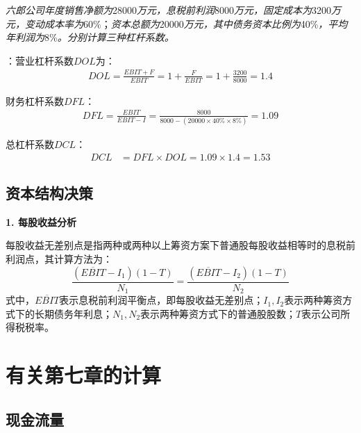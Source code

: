 \documentclass[
  10pt,
  twoside,
  openany,
  b5paper, %
  colorscheme = black, %
  xits = false,
]{qyxf-book}
\begin{document}
\emph{六郎公司年度销售净额为}28000\emph{万元，息税前利润}8000\emph{万元，固定成本为}3200\emph{万元，变动成本率为}60\%；\emph{资本总额为}20000\emph{万元，其中债务资本比例为}40\%\emph{，平均年利润为}8\%\emph{。分别计算三种杠杆系数。}

\solve[答]：营业杠杆系数$DOL$为：
\begin{equation*}
	\begin{aligned}
		DOL = \frac{EBIT+F}{EBIT} 
		= 1+\frac{F}{EBIT} 
		= 1+\frac{3200}{8000} 
		= 1.4
	\end{aligned}
\end{equation*}

财务杠杆系数$DFL$：
\begin{equation*}
	\begin{aligned}
		DFL = \frac{EBIT}{EBIT-I} 
		= \frac{8000}{8000-(20000\times 40\% \times 8\%)} 
		= 1.09
	\end{aligned}
\end{equation*}

总杠杆系数$DCL$：
\begin{equation*}
	\begin{aligned}
		DCL &= DFL \times DOL = 1.09 \times 1.4 
		= 1.53
	\end{aligned}
\end{equation*}
\subsection{资本结构决策}

\textbf{1. 每股收益分析}

每股收益无差别点是指两种或两种以上筹资方案下普通股每股收益相等时的息税前利润点，其计算方法为：
\begin{equation*}
	\frac{(\overline{EBIT}-I_1)(1-T)}{N_1}= \frac{(\overline{EBIT}-I_2)(1-T)}{N_2}
\end{equation*}
式中，$\overline{EBIT}$表示息税前利润平衡点，即每股收益无差别点；$I_1,I_2$表示两种筹资方式下的长期债务年利息；$N_1,N_2$表示两种筹资方式下的普通股股数；$T$表示公司所得税税率。

\newpage

\section{有关第七章的计算}

\subsection{现金流量}
\end{document}

